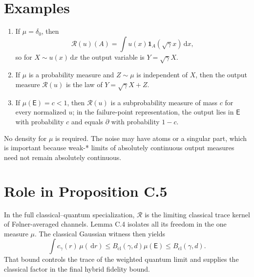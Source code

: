 \documentclass[11pt]{article}
\newcommand{\dd}{\,\mathrm d}
\begin{document}
\section{Examples}

\begin{enumerate}
  \item If $\mu=\delta_0$, then
  \[
    \mathcal R(u)(A)=\int u(x)\mathbf1_A(\sqrt\gamma x)\dd x,
  \]
  so for $X\sim u(x)\dd x$ the output variable is
  $Y=\sqrt\gamma X$.
  \item If $\mu$ is a probability measure and $Z\sim\mu$ is independent of
  $X$, then the output measure $\mathcal R(u)$ is the law of
  $Y=\sqrt\gamma X+Z$.
  \item If $\mu(\mathsf E)=c<1$, then $\mathcal R(u)$ is a subprobability measure
  of mass $c$ for every normalized $u$; in the failure-point representation,
  the output lies in $\mathsf E$ with probability $c$ and equals $\partial$ with
  probability $1-c$.
\end{enumerate}

No density for $\mu$ is required.  The noise may have atoms or a singular
part, which is important because weak-* limits of absolutely continuous
output measures need not remain absolutely continuous.

\section{Role in Proposition C.5}

In the full classical--quantum specialization, $\mathcal R$ is the limiting
classical trace kernel of F\o lner-averaged channels.  Lemma C.4 isolates all
its freedom in
the one measure $\mu$.  The classical Gaussian witness then yields
\[
  \int c_\gamma(r)\,\mu(\dd r)
  \leq B_{\mathrm{cl}}(\gamma,d)\mu(\mathsf E)
  \leq B_{\mathrm{cl}}(\gamma,d).
\]
That bound controls the trace of the weighted quantum limit and supplies the
classical factor in the final hybrid fidelity bound.
\end{document}
